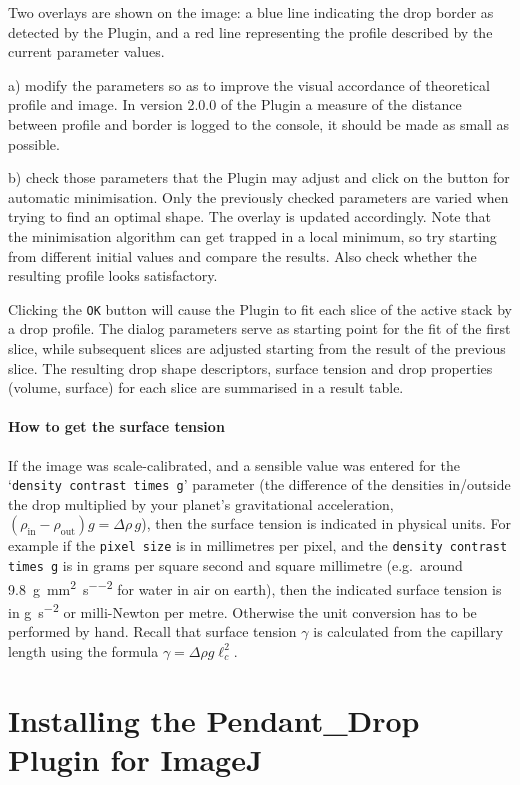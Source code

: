 \documentclass[fleqn]{scrartcl}
\begin{document}
Two overlays are shown on the image: a blue line indicating the drop
border as detected by the Plugin, and a red line representing the
profile described by the current parameter values.

a) modify the parameters so as to improve the visual accordance of
theoretical profile and image. In version 2.0.0 of the Plugin a
measure of the distance between profile and border is logged to the
console, it should be made as small as possible.

b) check those parameters that the Plugin may adjust and click on the
button for automatic minimisation. Only the previously checked
parameters are varied when trying to find an optimal shape. The
overlay is updated accordingly. Note that the minimisation algorithm
can get trapped in a local minimum, so try starting from different
initial values and compare the results. Also check whether the
resulting profile looks satisfactory.

Clicking the \texttt{OK} button will cause the Plugin to fit each
slice of the active stack by a drop profile. The dialog parameters
serve as starting point for the fit of the first slice, while
subsequent slices are adjusted starting from the result of the
previous slice. The resulting drop shape descriptors, surface tension
and drop properties (volume, surface) for each slice are summarised in
a result table.

\paragraph{How to get the surface tension}
If the image was scale-calibrated, and a sensible value was entered
for the `\texttt{density contrast times g}' parameter (the difference
of the densities in/outside the drop multiplied by your planet's
gravitational acceleration, $(\rho_{\mathrm{in}}-\rho_{\mathrm{out}})g
= \Delta\rho\,g$), then the surface tension is indicated in physical
units. For example if the \texttt{pixel size} is in millimetres per
pixel, and the \texttt{density contrast times g} is in grams per
square second and square millimetre (e.g.\ around
\SI{9.8}{\gram\per\square\milli\metre\per\square\second} for water in
air on earth), then the indicated surface tension is in
\si{\gram\per\square\second} or milli-Newton per metre. Otherwise the
unit conversion has to be performed by hand. Recall that surface
tension $\gamma$ is calculated from the capillary length using the
formula $\gamma = \Delta\!\rho g \ell_c^2$.


\section{Installing the Pendant\_Drop Plugin for ImageJ}
\label{sec:installation}
\end{document}
